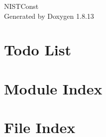 \documentclass[twoside]{book}
\newcommand{\+}{\discretionary{\mbox{\scriptsize$\hookleftarrow$}}{}{}}
\newcommand{\clearemptydoublepage}{%
  \newpage{\pagestyle{empty}\cleardoublepage}%
}
\begin{document}
\hypersetup{pageanchor=false,
             bookmarksnumbered=true,
             pdfencoding=unicode
            }
\begin{titlepage}
\vspace*{7cm}
\begin{center}%
{\Large N\+I\+S\+T\+Const }\\
\vspace*{1cm}
{\large Generated by Doxygen 1.8.13}\\
\end{center}
\end{titlepage}
\clearemptydoublepage
{}
\tableofcontents
\clearemptydoublepage
{}
\hypersetup{pageanchor=true}

\chapter{Todo List}
\label{todo}

\chapter{Module Index}

\chapter{File Index}

\end{document}
